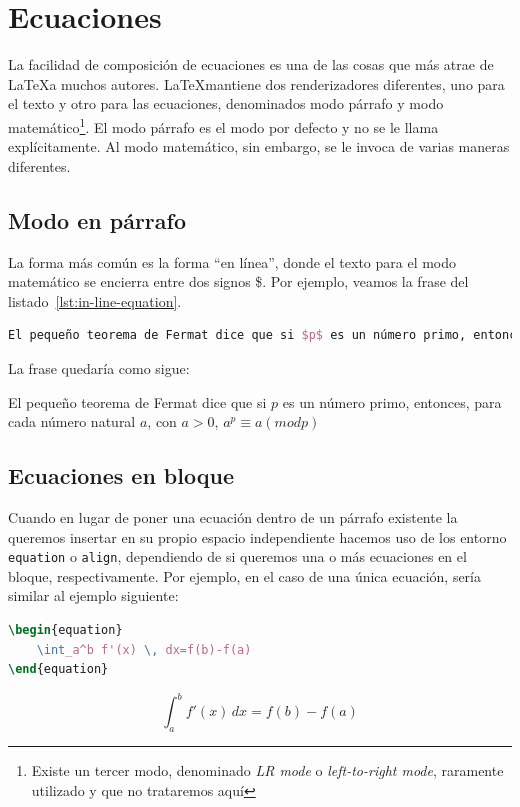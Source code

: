 \documentclass[%
    school=etsisi,%
    degree=61TI,%
]{upm-report}
\begin{document}
\section{Ecuaciones}

La facilidad de composición de ecuaciones es una de las cosas que más atrae de \LaTeX\space a muchos autores. \LaTeX mantiene dos renderizadores diferentes, uno para el texto y otro para las ecuaciones, denominados modo párrafo y modo matemático\footnote{Existe un tercer modo, denominado \textit{LR mode} o \textit{left-to-right mode}, raramente utilizado y que no trataremos aquí}. El modo párrafo es el modo por defecto y no se le llama explícitamente. Al modo matemático, sin embargo, se le invoca de varias maneras diferentes.

\subsection{Modo en párrafo}

La forma más común es la forma ``en línea'', donde el texto para el modo matemático se encierra entre dos signos \$. Por ejemplo, veamos la frase del listado~\ref{lst:in-line-equation}.

\begin{lstlisting}[language=tex,caption=Ejemplo de inserción de fórmulas en linea,label=lst:in-line-equation]
El pequeño teorema de Fermat dice que si $p$ es un número primo, entonces, para cada número natural $a$, con $a>0$, $a^p \equiv a (\mod p)$
\end{lstlisting}

La frase quedaría como sigue:

El pequeño teorema de Fermat dice que si $p$ es un número primo, entonces, para cada número natural $a$, con $a>0$, $a^p \equiv a (mod p)$

\subsection{Ecuaciones en bloque}

Cuando en lugar de poner una ecuación dentro de un párrafo existente la queremos insertar en su propio espacio independiente hacemos uso de los entorno \texttt{equation} o \texttt{align}, dependiendo de si queremos una o más ecuaciones en el bloque, respectivamente. Por ejemplo, en el caso de una única ecuación, sería similar al ejemplo siguiente:

\begin{minipage}[c]{.5\textwidth}
\begin{lstlisting}[language=tex]
\begin{equation}
	\int_a^b f'(x) \, dx=f(b)-f(a)
\end{equation}
\end{lstlisting}
\end{minipage}%
\begin{minipage}[c]{.5\textwidth}
\begin{equation}
    \int_a^b f'(x) \, dx=f(b)-f(a)
\end{equation}
\end{minipage}
\end{document}
